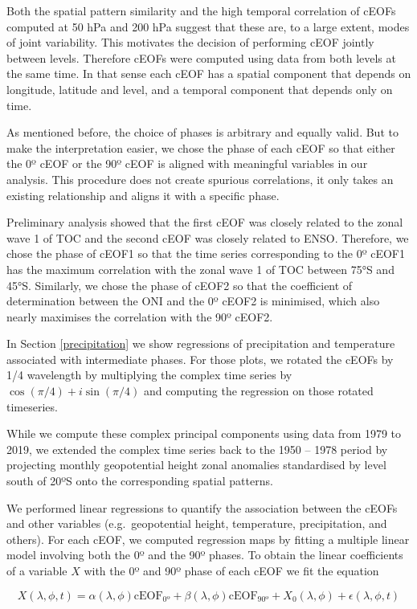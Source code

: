 \documentclass[pdflatex,lineno,sn-basic]{sn-jnl}
\theoremstyle{thmstyleone}%
\theoremstyle{thmstyletwo}%
\theoremstyle{thmstylethree}%
\begin{document}
Both the spatial pattern similarity and the high temporal correlation of cEOFs computed at 50 hPa and 200 hPa suggest that these are, to a large extent, modes of joint variability.
This motivates the decision of performing cEOF jointly between levels.
Therefore cEOFs were computed using data from both levels at the same time.
In that sense each cEOF has a spatial component that depends on longitude, latitude and level, and a temporal component that depends only on time.

As mentioned before, the choice of phases is arbitrary and equally valid.
But to make the interpretation easier, we chose the phase of each cEOF so that either the 0º cEOF or the 90º cEOF is aligned with meaningful variables in our analysis.
This procedure does not create spurious correlations, it only takes an existing relationship and aligns it with a specific phase.

Preliminary analysis showed that the first cEOF was closely related to the zonal wave 1 of TOC and the second cEOF was closely related to ENSO.
Therefore, we chose the phase of cEOF1 so that the time series corresponding to the 0º cEOF1 has the maximum correlation with the zonal wave 1 of TOC between 75°S and 45°S.
Similarly, we chose the phase of cEOF2 so that the coefficient of determination between the ONI and the 0º cEOF2 is minimised, which also nearly maximises the correlation with the 90º cEOF2.

In Section \ref{precipitation} we show regressions of precipitation and temperature associated with intermediate phases.
For those plots, we rotated the cEOFs by 1/4 wavelength by multiplying the complex time series by \(\cos(\pi/4) + i\sin(\pi/4)\) and computing the regression on those rotated timeseries.

While we compute these complex principal components using data from 1979 to 2019, we extended the complex time series back to the 1950 -- 1978 period by projecting monthly geopotential height zonal anomalies standardised by level south of 20ºS onto the corresponding spatial patterns.

We performed linear regressions to quantify the association between the cEOFs and other variables (e.g.~geopotential height, temperature, precipitation, and others).
For each cEOF, we computed regression maps by fitting a multiple linear model involving both the 0º and the 90º phases.
To obtain the linear coefficients of a variable \(X\) with the 0º and 90º phase of each cEOF we fit the equation

\[
X(\lambda, \phi, t) = \alpha(\lambda, \phi) \operatorname{cEOF_{0º}} + \beta(\lambda, \phi) \operatorname{cEOF_{90º}} + X_0(\lambda, \phi) + \epsilon(\lambda, \phi, t)
\]
\end{document}
